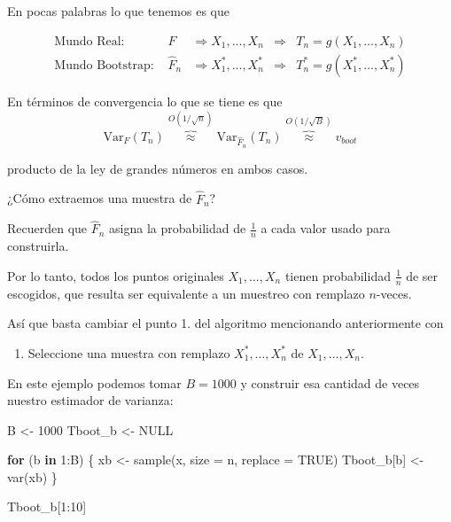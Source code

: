 \documentclass[
  12pt,
]{book}
\newenvironment{Shaded}{\begin{snugshade}}{\end{snugshade}}
\newcommand{\AttributeTok}[1]{\textcolor[rgb]{0.77,0.63,0.00}{#1}}
\newcommand{\ConstantTok}[1]{\textcolor[rgb]{0.00,0.00,0.00}{#1}}
\newcommand{\ControlFlowTok}[1]{\textcolor[rgb]{0.13,0.29,0.53}{\textbf{#1}}}
\newcommand{\DecValTok}[1]{\textcolor[rgb]{0.00,0.00,0.81}{#1}}
\newcommand{\FunctionTok}[1]{\textcolor[rgb]{0.00,0.00,0.00}{#1}}
\newcommand{\NormalTok}[1]{#1}
\newcommand{\OtherTok}[1]{\textcolor[rgb]{0.56,0.35,0.01}{#1}}
\newcommand{\SpecialCharTok}[1]{\textcolor[rgb]{0.00,0.00,0.00}{#1}}
\providecommand{\tightlist}{%
  \setlength{\itemsep}{0pt}\setlength{\parskip}{0pt}}
\begin{document}
En pocas palabras lo que tenemos es que

\begin{align*}
\text  {Mundo Real: }
& F
& \Longrightarrow  X_{1}, \ldots, X_{n}
& \Longrightarrow
& T_{n} = g\left(X_{1}, \ldots, X_{n}\right) \\
\text {Mundo Bootstrap: }
& \widehat{F}_{n}
& \Longrightarrow  X_{1}^{*}, \ldots, X_{n}^{*}
& \Longrightarrow
& T_{n}^{*}=g\left(X_{1}^{*}, \ldots, X_{n}^{*}\right)
\end{align*}

En términos de convergencia lo que se tiene es que \[
\mathrm{Var}_{F}\left(T_{n}\right) \overbrace{\approx}^{O(1 / \sqrt{n})} \mathrm{Var}_{\widehat{F}_{n}}\left(T_{n}\right) \overbrace{\approx}^{O(1 / \sqrt{B})} v_{b o o t}
\]

producto de la ley de grandes números en ambos casos.

¿Cómo extraemos una muestra de \(\hat{F}_n\)?

Recuerden que \(\hat{F}_{n}\) asigna la probabilidad de \(\frac{1}{n}\)
a cada valor usado para construirla.

Por lo tanto, todos los puntos originales \(X_{1},\ldots,X_{n}\) tienen
probabilidad \(\frac{1}{n}\) de ser escogidos, que resulta ser
equivalente a un muestreo con remplazo \(n\)-veces.

Así que basta cambiar el punto 1. del algoritmo mencionando
anteriormente con

\begin{enumerate}
\def\labelenumi{\arabic{enumi}.}
\tightlist
\item
  Seleccione una muestra con remplazo \(X_{1}^{*}, \ldots, X_{n}^{*}\)
  de \(X_{1},\ldots,X_{n}\).
\end{enumerate}

\leavevmode{}%
En este ejemplo podemos tomar \(B=1000\) y construir esa cantidad de
veces nuestro estimador de varianza:

\begin{Shaded}
\begin{Highlighting}[]
\NormalTok{B }\OtherTok{\textless{}{-}} \DecValTok{1000}
\NormalTok{Tboot\_b }\OtherTok{\textless{}{-}} \ConstantTok{NULL}

\ControlFlowTok{for}\NormalTok{ (b }\ControlFlowTok{in} \DecValTok{1}\SpecialCharTok{:}\NormalTok{B) \{}
\NormalTok{    xb }\OtherTok{\textless{}{-}} \FunctionTok{sample}\NormalTok{(x, }\AttributeTok{size =}\NormalTok{ n, }\AttributeTok{replace =} \ConstantTok{TRUE}\NormalTok{)}
\NormalTok{    Tboot\_b[b] }\OtherTok{\textless{}{-}} \FunctionTok{var}\NormalTok{(xb)}
\NormalTok{\}}

\NormalTok{Tboot\_b[}\DecValTok{1}\SpecialCharTok{:}\DecValTok{10}\NormalTok{]}
\end{Highlighting}
\end{Shaded}
\end{document}
